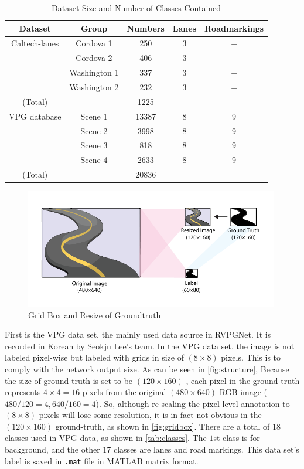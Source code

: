 \begin{spacing}{1.5}
\begin{table}[ht]
\centering
\caption{Dataset Size and Number of Classes Contained}
\label{tab:dataset}
\begin{tabular}{@{}ccccc@{}}
\toprule
Dataset & Group & Numbers & Lanes & Roadmarkings \\ \midrule
Caltech-lanes & Cordova 1 & 250 & 3 & $-$ \\
 & Cordova 2 & 406 & 3 & $-$ \\
 & Washington 1 & 337 & 3 & $-$ \\
 & Washington 2 & 232 & 3 & $-$ \\
(Total) &  & 1225 &  &  \\
VPG database & Scene 1 & 13387 & 8 & 9 \\
 & Scene 2 & 3998 & 8 & 9 \\
 & Scene 3 & 818 & 8 & 9 \\
 & Scene 4 & 2633 & 8 & 9 \\
(Total) &  & 20836 &  &  \\ \bottomrule
\end{tabular}
\end{table}

\begin{figure}[ht]
\centering
\includegraphics[width=0.99\textwidth, fbox]{Chapter3/gridbox.pdf}
\caption{Grid Box and Resize of Groundtruth}
\label{fig:gridbox} 
\end{figure}

First is the VPG data set, the mainly used data source in RVPGNet. It is recorded in Korean by Seokju Lee's team. In the VPG data set, the image is not labeled pixel-wise but labeled with grids in size of $(8 \times 8)$ pixels. This is to comply with the network output size. As can be seen in \autoref{fig:structure}, Because the size of ground-truth is set to be $(120 \times 160)$ , each pixel in the ground-truth represents $4 \times 4 = 16$ pixels from the original $(480 \times 640)$ RGB-image ($480/120 = 4, 640/160 =  4$). So, although re-scaling the pixel-level annotation to $(8\times 8)$ pixels will lose some resolution, it is in fact not obvious in the $(120 \times 160)$ ground-truth, as shown in \autoref{fig:gridbox}. There are a total of $18$ classes used in VPG data, as shown in \autoref{tab:classes}. The $1$st class is for background, and the other $17$ classes are lanes and road markings. This data set's label is saved in \texttt{.mat} file in MATLAB matrix format.



\end{spacing}
